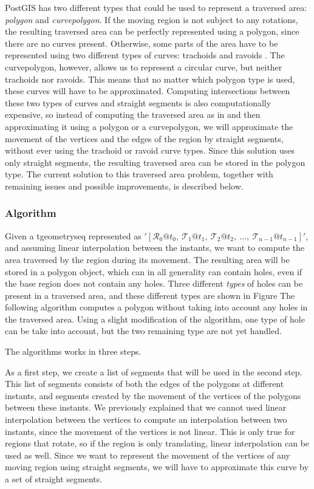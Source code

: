 PostGIS has two different types that could be used to represent a traversed area: \textit{polygon} and \textit{curvepolygon}. If the moving region is not subject to any rotations, the resulting traversed area can be perfectly represented using a polygon, since there are no curves present. Otherwise, some parts of the area have to be represented using two different types of curves: trachoids and ravoids \cite{fmregion}. The curvepolygon, however, allows us to represent a circular curve, but neither trachoids nor ravoids. This means that no matter which polygon type is used, these curves will have to be approximated. Computing intersections between these two types of curves and straight segments is also computationally expensive, so instead of computing the traversed area as in \cite{fmregion} and then approximating it using a polygon or a curvepolygon, we will approximate the movement of the vertices and the edges of the region by straight segments, without ever using the trachoid or ravoid curve types. Since this solution uses only straight segments, the resulting traversed area can be stored in the polygon type. The current solution to this traversed area problem, together with remaining issues and possible improvements, is described below.

\subsubsection{Algorithm}

Given a tgeometryseq represented as $'[\mathcal{R}_0@t_0,\ \mathcal{T}_1@t_1,\ \mathcal{T}_2@t_2,\ ..., \ \mathcal{T}_{n-1}@t_{n-1}]'$, and assuming linear interpolation between the instants, we want to compute the area traversed by the region during its movement. The resulting area will be stored in a polygon object, which can in all generality can contain holes, even if the base region does not contain any holes. Three different \textit{types} of holes can be present in a traversed area, and these different types are shown in Figure  The following algorithm computes a polygon without taking into account any holes in the traversed area. Using a slight modification of the algorithm, one type of hole can be take into account, but the two remaining type are not yet handled.


The algorithms works in three steps.

As a first step, we create a list of segments that will be used in the second step. This list of segments consists of both the edges of the polygons at different instants, and segments created by the movement of the vertices of the polygons between these instants. We previously explained that we cannot used linear interpolation between the vertices to compute an interpolation between two instants, since the movement of the vertices is not linear. This is only true for regions that rotate, so if the region is only translating, linear interpolation can be used as well. Since we want to represent the movement of the vertices of any moving region using straight segments, we will have to approximate this curve by a set of straight segments. 

